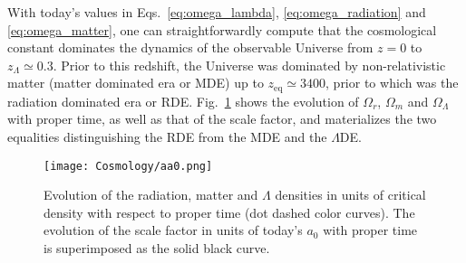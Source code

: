 With today's values in Eqs.~\ref{eq:omega_lambda}, \ref{eq:omega_radiation} and \ref{eq:omega_matter}, one can straightforwardly compute that the cosmological constant dominates the dynamics of the observable Universe from $z=0$ to $z_\Lambda \simeq 0.3$. Prior to this redshift, the Universe was dominated by non-relativistic matter (matter dominated era or MDE) up to $z_{\mathrm{eq}} \simeq 3400$, prior to which was the radiation dominated era or RDE. Fig.~\ref{fig:cosmichistory} shows the evolution of $\Omega_r$, $\Omega_m$ and $\Omega_\Lambda$ with proper time, as well as that of the scale factor, and materializes the two equalities distinguishing the RDE from the MDE and the $\Lambda$DE. 

\begin{figure}
\begin{center}
\texttt{[image: Cosmology/aa0.png]}
\caption{Evolution of the radiation, matter and $\Lambda$ densities in units of critical density with respect to proper time (dot dashed color curves). The evolution of the scale factor in units of today's $a_0$ with proper time is superimposed as the solid black curve.}
\label{fig:cosmichistory}
\end{center}
\end{figure}

\clearpage